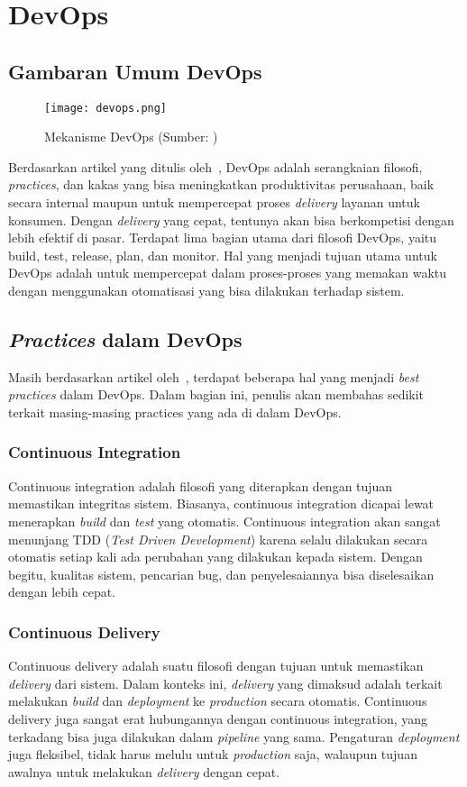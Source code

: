 \section{DevOps}

\subsection{Gambaran Umum DevOps}
\begin{figure}[h]
  \centering
  \texttt{[image: devops.png]}
  \caption{Mekanisme DevOps (Sumber: \cite{devops})}
\end{figure}
Berdasarkan artikel yang ditulis oleh~\cite{devops}, DevOps adalah serangkaian filosofi, \textit{practices}, dan kakas yang bisa meningkatkan produktivitas perusahaan, baik secara internal maupun untuk mempercepat proses \textit{delivery} layanan untuk konsumen.
Dengan \textit{delivery} yang cepat, tentunya akan bisa berkompetisi dengan lebih efektif di pasar.
Terdapat lima bagian utama dari filosofi DevOps, yaitu build, test, release, plan, dan monitor.
Hal yang menjadi tujuan utama untuk DevOps adalah untuk mempercepat dalam proses-proses yang memakan waktu dengan menggunakan otomatisasi yang bisa dilakukan terhadap sistem.

\subsection{\textit{Practices} dalam DevOps}
Masih berdasarkan artikel oleh~\cite{devops}, terdapat beberapa hal yang menjadi \textit{best practices} dalam DevOps. 
Dalam bagian ini, penulis akan membahas sedikit terkait masing-masing practices yang ada di dalam DevOps.

\subsubsection{Continuous Integration}
Continuous integration adalah filosofi yang diterapkan dengan tujuan memastikan integritas sistem.
Biasanya, continuous integration dicapai lewat menerapkan \textit{build} dan \textit{test} yang otomatis.
Continuous integration akan sangat menunjang TDD (\textit{Test Driven Development}) karena selalu dilakukan secara otomatis setiap kali ada perubahan yang dilakukan kepada sistem.
Dengan begitu, kualitas sistem, pencarian bug, dan penyelesaiannya bisa diselesaikan dengan lebih cepat.


\subsubsection{Continuous Delivery}
Continuous delivery adalah suatu filosofi dengan tujuan untuk memastikan \textit{delivery} dari sistem.
Dalam konteks ini, \textit{delivery} yang dimaksud adalah terkait melakukan \textit{build} dan \textit{deployment} ke \textit{production} secara otomatis.
Continuous delivery juga sangat erat hubungannya dengan continuous integration, yang terkadang bisa juga dilakukan dalam \textit{pipeline} yang sama.
Pengaturan \textit{deployment} juga fleksibel, tidak harus melulu untuk \textit{production} saja, walaupun tujuan awalnya untuk melakukan \textit{delivery} dengan cepat.

